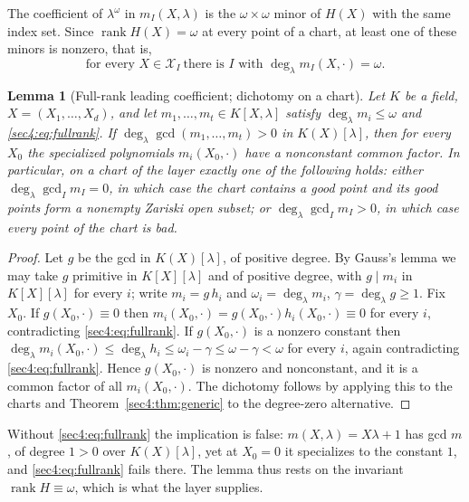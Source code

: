 \documentclass[journal]{IEEEtran}
\theoremstyle{plainn}
\newtheorem{lem}[thm]{Lemma}
\theoremstyle{remark}
\newcommand{\rank}{\operatorname{rank}}
\begin{document}
The coefficient of $\lambda^\omega$ in $m_I(X,\lambda)$ is the $\omega\times\omega$ minor of $H(X)$
with the same index set. Since $\rank H(X)=\omega$ at every point of a chart, at least one of these
minors is nonzero, that is,
\begin{equation}
\label{sec4:eq:fullrank}
\text{for every }X\in\mathcal X_I\ \text{there is }I\text{ with }
\deg_\lambda m_I(X,\cdot)=\omega .
\end{equation}

\begin{lem}[Full-rank leading coefficient; dichotomy on a chart]
\label{sec4:lem:fullrank}
\label{sec4:cor:dichotomy}
Let $K$ be a field, $X=(X_1,\dots,X_d)$, and let $m_1,\dots,m_t\in K[X,\lambda]$ satisfy
$\deg_\lambda m_i\le\omega$ and \eqref{sec4:eq:fullrank}. If
$\deg_\lambda\gcd(m_1,\dots,m_t)>0$ in $K(X)[\lambda]$, then for \emph{every} $X_0$ the specialized
polynomials $m_i(X_0,\cdot)$ have a nonconstant common factor. In particular, on a chart of the layer
exactly one of the following holds: either $\deg_\lambda\gcd_I m_I=0$, in which case the chart contains
a good point and its good points form a nonempty Zariski open subset; or
$\deg_\lambda\gcd_I m_I>0$, in which case \emph{every} point of the chart is bad.
\end{lem}

\begin{proof}
Let $g$ be the gcd in $K(X)[\lambda]$, of positive degree. By Gauss's lemma \cite{lan02} we may take
$g$ primitive in $K[X][\lambda]$ and of positive degree, with $g\mid m_i$ in $K[X][\lambda]$ for every
$i$; write $m_i=g\,h_i$ and $\omega_i=\deg_\lambda m_i$, $\gamma=\deg_\lambda g\ge1$. Fix $X_0$. If
$g(X_0,\cdot)\equiv0$ then $m_i(X_0,\cdot)=g(X_0,\cdot)h_i(X_0,\cdot)\equiv0$ for every $i$,
contradicting \eqref{sec4:eq:fullrank}. If $g(X_0,\cdot)$ is a nonzero constant then
$\deg_\lambda m_i(X_0,\cdot)\le\deg_\lambda h_i\le\omega_i-\gamma\le\omega-\gamma<\omega$ for every
$i$, again contradicting \eqref{sec4:eq:fullrank}. Hence $g(X_0,\cdot)$ is nonzero and nonconstant, and
it is a common factor of all $m_i(X_0,\cdot)$. The dichotomy follows by applying this to the charts and
Theorem~\ref{sec4:thm:generic} to the degree-zero alternative.
\end{proof}

Without \eqref{sec4:eq:fullrank} the implication is false: $m(X,\lambda)=X\lambda+1$ has gcd $m$, of
degree $1>0$ over $K(X)[\lambda]$, yet at $X_0=0$ it specializes to the constant $1$, and
\eqref{sec4:eq:fullrank} fails there. The lemma thus rests on the invariant $\rank H\equiv\omega$,
which is what the layer supplies.
\end{document}
